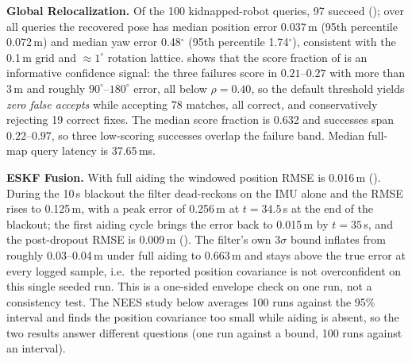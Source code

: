 


\noindent\textbf{Global Relocalization.} Of the 100 kidnapped-robot queries, 97 succeed (); over all queries the recovered pose has median position error 0.037\,m (95th percentile 0.072\,m) and median yaw error 0.48$^\circ$ (95th percentile 1.74$^\circ$), consistent with the 0.1\,m grid and $\approx1^\circ$ rotation lattice.  shows that the score fraction of  is an informative confidence signal: the three failures score in $0.21$--$0.27$ with more than 3\,m and roughly $90^\circ$--$180^\circ$ error, all below $\rho=0.40$, so the default threshold yields \emph{zero false accepts} while accepting 78 matches, all correct, and conservatively rejecting 19 correct fixes. The median score fraction is 0.632 and successes span $0.22$--$0.97$, so three low-scoring successes overlap the failure band. Median full-map query latency is 37.65\,ms.



\noindent\textbf{ESKF Fusion.} With full aiding the windowed position RMSE is 0.016\,m (). During the 10\,s blackout the filter dead-reckons on the IMU alone and the RMSE rises to 0.125\,m, with a peak error of 0.256\,m at $t=34.5$\,s at the end of the blackout; the first aiding cycle brings the error back to 0.015\,m by $t=35$\,s, and the post-dropout RMSE is 0.009\,m (). The filter's own $3\sigma$ bound inflates from roughly 0.03--0.04\,m under full aiding to 0.663\,m and stays above the true error at every logged sample, i.e.\ the reported position covariance is not overconfident on this single seeded run. This is a one-sided envelope check on one run, not a consistency test. The NEES study below averages 100 runs against the 95\% interval and finds the position covariance too small while aiding is absent, so the two results answer different questions (one run against a bound, 100 runs against an interval).



